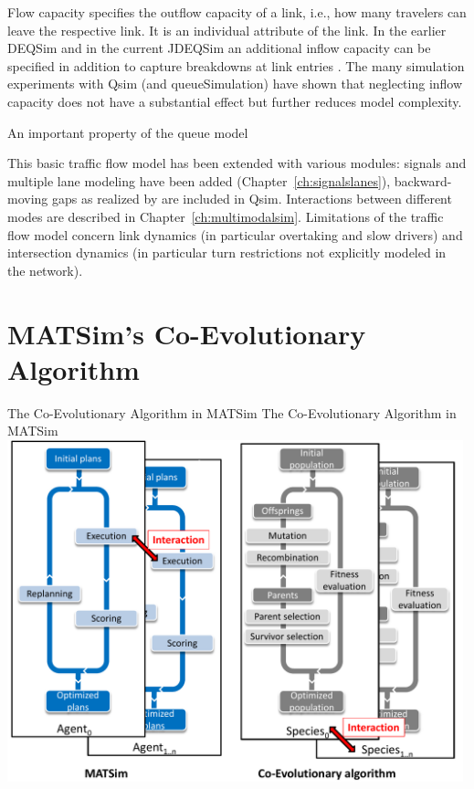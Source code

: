 Flow capacity specifies the outflow capacity of a link, i.e., how many travelers can leave the respective link. It is an individual attribute of the link. In the earlier DEQSim and in the current JDEQSim an additional inflow capacity can be specified in addition to capture breakdowns at link entries \citep[][p.99]{Charypar_PhDThesis_2008}. The many simulation experiments with Qsim (and queueSimulation) have shown that neglecting inflow capacity does not have a substantial effect but further reduces model complexity. 

An important property of the queue model 



This basic traffic flow model has been extended with various modules: signals and multiple lane modeling have been added (Chapter~\ref{ch:signalslanes}), backward-moving gaps as realized by \citet[][]{Charypar_PhDThesis_2008} are included in Qsim. Interactions between different modes are described in Chapter~\ref{ch:multimodalsim}. Limitations of the traffic flow model concern link dynamics (in particular overtaking and slow drivers) and intersection dynamics (in particular turn restrictions not explicitly modeled in the network). 


\section{MATSim's Co-Evolutionary Algorithm}
\label{sec:co-ev}


\createfigure%
{The Co-Evolutionary Algorithm in MATSim}%
{The Co-Evolutionary Algorithm in MATSim }%
{\label{fig:ea}}%
{\includegraphics[width=0.99\textwidth, angle=0]{using/figures/MATSimVSea.pdf}}%
{}

